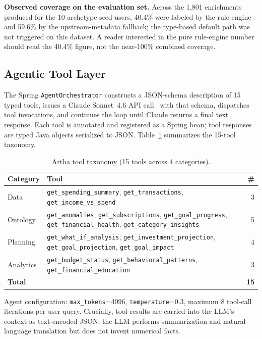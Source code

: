 \documentclass[conference]{IEEEtran}
\begin{document}
\textbf{Observed coverage on the evaluation set.} Across the 1{,}801
enrichments produced for the 10 archetype seed users, 40.4\% were
labeled by the rule engine and 59.6\% by the upstream-metadata
fallback; the type-based default path was not triggered on this
dataset. A reader interested in the pure rule-engine number should
read the 40.4\% figure, not the near-100\% combined coverage.

\subsection{Agentic Tool Layer}
\label{sec:tools}

The Spring \texttt{AgentOrchestrator} constructs a JSON-schema
description of 15 typed tools, issues a Claude Sonnet~4.6 API
call~\cite{claude_sonnet} with that schema, dispatches tool
invocations, and continues the loop until Claude returns a final
text response. Each tool is annotated and registered as a Spring
bean; tool responses are typed Java objects serialized to JSON.
Table~\ref{tab:tools} summarizes the 15-tool taxonomy.

\begin{table}[t]
\centering
\caption{Artha tool taxonomy (15 tools across 4 categories).}
\label{tab:tools}
\begin{tabular}{@{}lp{3.2cm}r@{}}
\toprule
Category & Tool & \# \\
\midrule
Data &
\texttt{get\_spending\_summary},
\texttt{get\_transactions},
\texttt{get\_income\_vs\_spend}
& 3 \\
\addlinespace
Ontology &
\texttt{get\_anomalies},
\texttt{get\_subscriptions},
\texttt{get\_goal\_progress},
\texttt{get\_financial\_health},
\texttt{get\_category\_insights}
& 5 \\
\addlinespace
Planning &
\texttt{get\_what\_if\_analysis},
\texttt{get\_investment\_projection},
\texttt{get\_goal\_projection},
\texttt{get\_goal\_impact}
& 4 \\
\addlinespace
Analytics &
\texttt{get\_budget\_status},
\texttt{get\_behavioral\_patterns},
\texttt{get\_financial\_education}
& 3 \\
\midrule
\textbf{Total} & & \textbf{15} \\
\bottomrule
\end{tabular}
\end{table}

Agent configuration: \texttt{max\_tokens}=4096,
\texttt{temperature}=0.3, maximum 8 tool-call iterations per user
query. Crucially, tool results are carried into the LLM's context
as text-encoded JSON: the LLM performs summarization and
natural-language translation but does not invent numerical facts.
\end{document}
